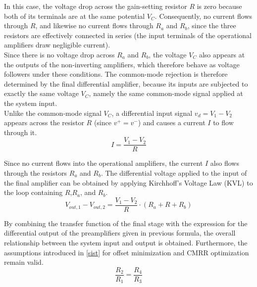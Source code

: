 \documentclass[../main.tex]{subfiles}
\begin{document}
In this case, the voltage drop across the gain-setting resistor $R$ is zero because both of its terminals are at the same potential $V_C$. Consequently, no current flows through $R$, and likewise no current flows through $R_a$ and $R_b$, since the three resistors are effectively connected in series (the input terminals of the operational amplifiers draw negligible current).\\

Since there is no voltage drop across $R_a$ and $R_b$, the voltage $V_C$ also appears at the outputs of the non-inverting amplifiers, which therefore behave as voltage followers under these conditions. The common-mode rejection is therefore determined by the final differential amplifier, because its inputs are subjected to exactly the same voltage $V_C$, namely the same common-mode signal applied at the system input.\\

Unlike the common-mode signal $V_C$, a differential input signal $v_d = V_1 - V_2$ appears across the resistor $R$ (since $v^+ = v^-$) and causes a current $I$ to flow through it.\\

\begin{equation}
	I = \frac{V_1 - V_2}{R}
\end{equation}

Since no current flows into the operational amplifiers, the current $I$ also flows through the resistors $R_a$ and $R_b$. The differential voltage applied to the input of the final amplifier can be obtained by applying Kirchhoff's Voltage Law (KVL) to the loop containing $R$,$R_a$, and $R_b$.\\

\begin{equation}
	V_{out,1} - V_{out,2} = \frac{V_1 - V_2}{R} \cdot (R_a + R + R_b) 
\end{equation}

By combining the transfer function of the final stage with the expression for the differential output of the preamplifiers given in previous formula, the overall relationship between the system input and output is obtained. Furthermore, the assumptions introduced in \autoref{sist} for offset minimization and CMRR optimization remain valid.\\

\begin{equation}
	\frac{R_2}{R_1} = \frac{R_4}{R_3}
\end{equation}
\end{document}

